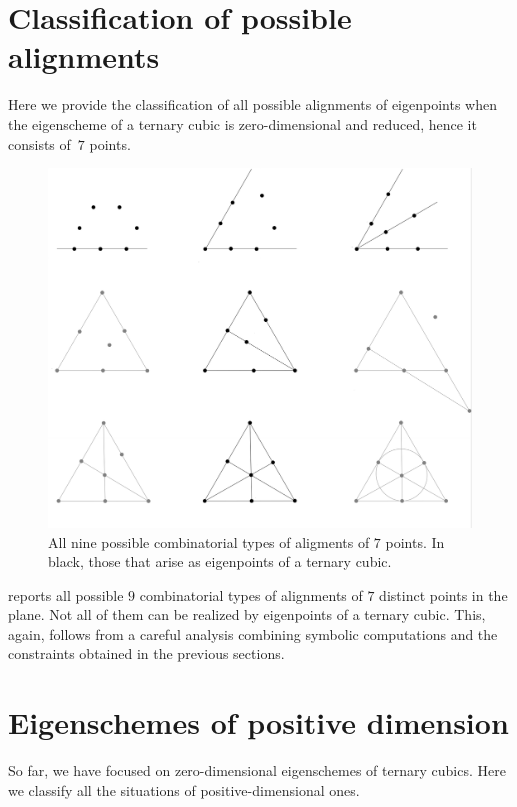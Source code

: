 \documentclass[11pt, a4paper, reqno, captions=tableheading,bibliography=totoc]{scrartcl}
\theoremstyle{plain}
\theoremstyle{definition}
\begin{document}
\section{Classification of possible alignments}
\label{alignments}

Here we provide the classification of all possible alignments of eigenpoints when the eigenscheme of a ternary cubic is zero-dimensional and reduced, hence it consists of~$7$ points.

\begin{figure}
 \centering
 \includegraphics[trim={0.2cm 0 0.1cm 0}, width=\textwidth]{alignments}
 \caption{All nine possible combinatorial types of aligments of $7$ points. In black, those that arise as eigenpoints of a ternary cubic.}
 \label{figure:alignments}
\end{figure}


 reports all possible $9$ combinatorial types of alignments of $7$ distinct points in the plane. Not all of them can be realized by eigenpoints of a ternary cubic.
This, again, follows from a careful analysis combining symbolic computations and the constraints obtained in the previous sections.

\section{Eigenschemes of positive dimension}
\label{positive_dimensional}

So far, we have focused on zero-dimensional eigenschemes of ternary cubics.
Here we classify all the situations of positive-dimensional ones.
\end{document}

